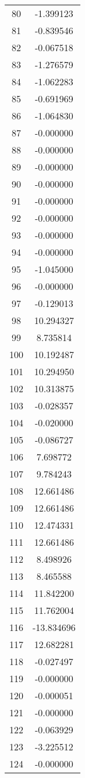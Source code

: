 \documentclass[12pt]{article}
\begin{document}
\begin{longtable}{@{}cc@{}}
80 & -1.399123 \\
81 & -0.839546 \\
82 & -0.067518 \\
83 & -1.276579 \\
84 & -1.062283 \\
85 & -0.691969 \\
86 & -1.064830 \\
87 & -0.000000 \\
88 & -0.000000 \\
89 & -0.000000 \\
90 & -0.000000 \\
91 & -0.000000 \\
92 & -0.000000 \\
93 & -0.000000 \\
94 & -0.000000 \\
95 & -1.045000 \\
96 & -0.000000 \\
97 & -0.129013 \\
98 & 10.294327 \\
99 & 8.735814 \\
100 & 10.192487 \\
101 & 10.294950 \\
102 & 10.313875 \\
103 & -0.028357 \\
104 & -0.020000 \\
105 & -0.086727 \\
106 & 7.698772 \\
107 & 9.784243 \\
108 & 12.661486 \\
109 & 12.661486 \\
110 & 12.474331 \\
111 & 12.661486 \\
112 & 8.498926 \\
113 & 8.465588 \\
114 & 11.842200 \\
115 & 11.762004 \\
116 & -13.834696 \\
117 & 12.682281 \\
118 & -0.027497 \\
119 & -0.000000 \\
120 & -0.000051 \\
121 & -0.000000 \\
122 & -0.063929 \\
123 & -3.225512 \\
124 & -0.000000 \\

\end{longtable}
\end{document}

